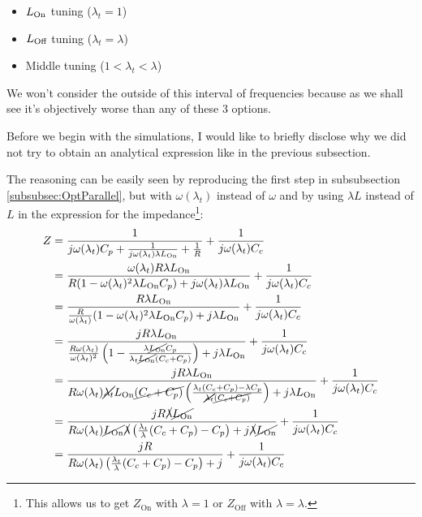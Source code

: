 \documentclass[../main.tex]{subfiles}
\begin{document}
\begin{itemize}[]
    \item \(L_{\text{On}}\) tuning (\(\lambda_{t} = 1\))
    \item \(L_{\text{Off}}\) tuning (\(\lambda_{t} = \lambda\))
    \item Middle tuning (\(1 < \lambda_{t} < \lambda\))
\end{itemize}

We won't consider the outside of this interval of frequencies because as we
shall see it's objectively worse than any of these 3 options.

Before we begin with the simulations, I would like to briefly disclose why
we did not try to obtain an analytical expression like in the previous
subsection.

The reasoning can be easily seen by reproducing the first step in subsubsection
\ref{subsubsec:OptParallel}, but with \(\omega(\lambda_{t})\) instead of
\(\omega\) and by using \(\lambda L\) instead of \(L\) in the expression
for the impedance\footnote{This allows us to get \(Z_{\text{On}}\) with
\(\lambda = 1\) or \(Z_{\text{Off}}\) with \(\lambda = \lambda\).}:
\begin{align*}
\label{eq:ImpKineticResonant}
\begin{split}
    Z &= \frac{1}{j \omega(\lambda_{t}) C_{p} + \frac{1}{j \omega(\lambda_{t}) \lambda L_{\text{On}}} + \frac{1}{R}}
        + \frac{1}{j \omega(\lambda_{t}) C_{c}}\\
      &= \frac{\omega(\lambda_{t}) R \lambda L_{\text{On}}}{R(1 - \omega(\lambda_{t})^2 \lambda L_{\text{On}} C_{p}) + j \omega(\lambda_{t}) \lambda L_{\text{On}}}
        + \frac{1}{j \omega(\lambda_{t}) C_{c}}\\
      &= \frac{R \lambda L_{\text{On}}}{\frac{R}{\omega(\lambda_{t})}(1 - \omega(\lambda_{t})^2 \lambda L_{\text{On}} C_{p}) + j \lambda L_{\text{On}}}
        + \frac{1}{j \omega(\lambda_{t}) C_{c}}\\
      &= \frac{j R \lambda L_{\text{On}}}{
          \frac{R\omega(\lambda_{t})}{\omega(\lambda_{t})^2}\left(1 - \frac{\lambda\cancel{L_{\text{On}}} C_{p}}{\lambda_{t}\cancel{L_{\text{On}}}(C_{c} + C_{p})}\right)
            + j \lambda L_{\text{On}}} + \frac{1}{j \omega(\lambda_{t})C_{c}}\\
      &= \frac{j R \lambda L_{\text{On}}}{
          R\omega(\lambda_{t})\cancel{\lambda_{t}}L_{\text{On}}\cancel{(C_{c} + C_{p})}
          \left(\frac{\lambda_{t}(C_{c} + C_{p}) - \lambda C_{p}}{\cancel{\lambda_{t}}\cancel{(C_{c} + C_{p})}}\right)
            + j \lambda L_{\text{On}}} + \frac{1}{j \omega(\lambda_{t})C_{c}}\\
      &= \frac{j R \cancel{\lambda}\cancel{L_{\text{On}}}}{
          R\omega(\lambda_{t})\cancel{L_{\text{On}}}\cancel{\lambda}
          \left(\frac{\lambda_{t}}{\lambda}(C_{c} + C_{p}) - C_{p}\right)
          + j \cancel{\lambda}\cancel{L_{\text{On}}}} + \frac{1}{j \omega(\lambda_{t})C_{c}}\\
      &= \frac{j R }{
          R\omega(\lambda_{t})
          \left(\frac{\lambda_{t}}{\lambda}(C_{c} + C_{p}) - C_{p}\right)
          + j } + \frac{1}{j \omega(\lambda_{t})C_{c}}\\
\end{split}
\end{align*}
\end{document}
